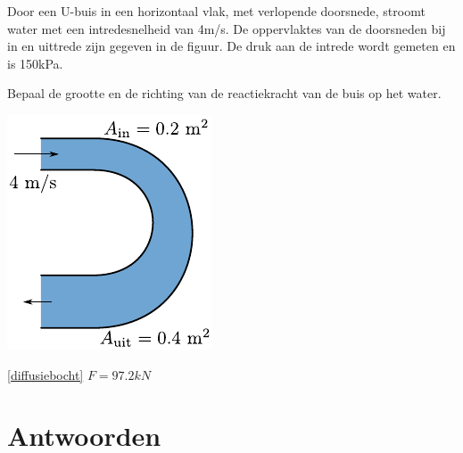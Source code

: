 	\begin{toepassing}[*]
		\label{diffusiebocht}
Door een U-buis in een horizontaal vlak, met verlopende doorsnede, stroomt water met een intredesnelheid van 4m/s. De oppervlaktes van de doorsneden bij in en uittrede zijn gegeven in de figuur. De druk aan de intrede wordt gemeten en is 150\unit{kPa}.
		
Bepaal de grootte en de richting van de reactiekracht van de buis op het water.

\centering
\includegraphics{fig/behoudsvergelijkingen/diffusiebocht}
	\end{toepassing}
	\begin{antwoord}{\ref{diffusiebocht}}
		$F = 97.2\unit{kN}$
	\end{antwoord}
	
	\section*{Antwoorden}
	\begin{multicols}{2}
	\end{multicols}